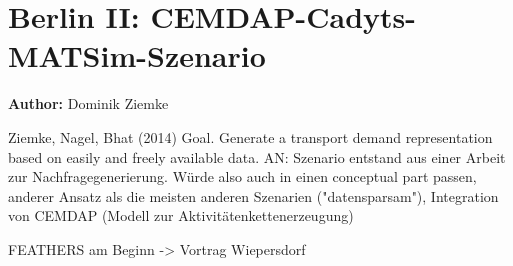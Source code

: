 \section{Berlin II: CEMDAP-Cadyts-MATSim-Szenario}
\label{ch:scenarios:berlinII}
\hfill \textbf{Author:} Dominik Ziemke

Ziemke, Nagel, Bhat (2014)
Goal. Generate a transport demand representation based on easily and freely available data.
AN: Szenario entstand aus einer Arbeit zur Nachfragegenerierung. Würde also auch in einen conceptual part passen, anderer Ansatz als die meisten anderen Szenarien ("datensparsam"), Integration von CEMDAP (Modell zur Aktivitätenkettenerzeugung)


FEATHERS am Beginn -> Vortrag Wiepersdorf


